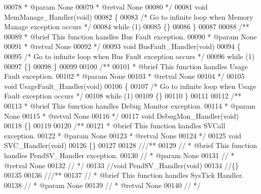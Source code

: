 \begin{DoxyCode}
00078 \textcolor{comment}{  * @param  None}
00079 \textcolor{comment}{  * @retval None}
00080 \textcolor{comment}{  */}
00081 \textcolor{keywordtype}{void} MemManage_Handler(\textcolor{keywordtype}{void})
00082 \{
00083   \textcolor{comment}{/* Go to infinite loop when Memory Manage exception occurs */}
00084   \textcolor{keywordflow}{while} (1)
00085   \{\}
00086 \}
00087 
00088 \textcolor{comment}{/**}
00089 \textcolor{comment}{  * @brief  This function handles Bus Fault exception.}
00090 \textcolor{comment}{  * @param  None}
00091 \textcolor{comment}{  * @retval None}
00092 \textcolor{comment}{  */}
00093 \textcolor{keywordtype}{void} BusFault_Handler(\textcolor{keywordtype}{void})
00094 \{
00095   \textcolor{comment}{/* Go to infinite loop when Bus Fault exception occurs */}
00096   \textcolor{keywordflow}{while} (1)
00097   \{\}
00098 \}
00099 
00100 \textcolor{comment}{/**}
00101 \textcolor{comment}{  * @brief  This function handles Usage Fault exception.}
00102 \textcolor{comment}{  * @param  None}
00103 \textcolor{comment}{  * @retval None}
00104 \textcolor{comment}{  */}
00105 \textcolor{keywordtype}{void} UsageFault_Handler(\textcolor{keywordtype}{void})
00106 \{
00107   \textcolor{comment}{/* Go to infinite loop when Usage Fault exception occurs */}
00108   \textcolor{keywordflow}{while} (1)
00109   \{\}
00110 \}
00111 
00112 \textcolor{comment}{/**}
00113 \textcolor{comment}{  * @brief  This function handles Debug Monitor exception.}
00114 \textcolor{comment}{  * @param  None}
00115 \textcolor{comment}{  * @retval None}
00116 \textcolor{comment}{  */}
00117 \textcolor{keywordtype}{void} DebugMon_Handler(\textcolor{keywordtype}{void})
00118 \{\}
00119 
00120 \textcolor{comment}{/**}
00121 \textcolor{comment}{  * @brief  This function handles SVCall exception.}
00122 \textcolor{comment}{  * @param  None}
00123 \textcolor{comment}{  * @retval None}
00124 \textcolor{comment}{  */}
00125 \textcolor{keywordtype}{void} SVC_Handler(\textcolor{keywordtype}{void})
00126 \{\}
00127 
00128 \textcolor{comment}{///**}
00129 \textcolor{comment}{//  * @brief  This function handles PendSV\_Handler exception.}
00130 \textcolor{comment}{//  * @param  None}
00131 \textcolor{comment}{//  * @retval None}
00132 \textcolor{comment}{//  */}
00133 \textcolor{comment}{//void PendSV\_Handler(void)}
00134 \textcolor{comment}{//\{\}}
00135 
00136 \textcolor{comment}{///**}
00137 \textcolor{comment}{//  * @brief  This function handles SysTick Handler.}
00138 \textcolor{comment}{//  * @param  None}
00139 \textcolor{comment}{//  * @retval None}
00140 \textcolor{comment}{//  */}

\end{DoxyCode}
